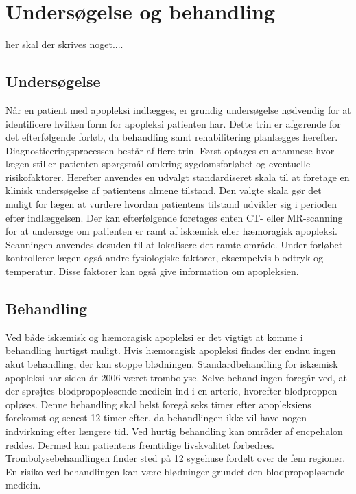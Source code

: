 \section{Undersøgelse og behandling}
her skal der skrives noget....
\subsection{Undersøgelse}
Når en patient med apopleksi indlægges, er grundig undersøgelse nødvendig for at identificere hvilken form for apopleksi patienten har. Dette trin er afgørende for det efterfølgende forløb, da behandling samt rehabilitering planlægges herefter.
Diagnosticeringsprocessen består af flere trin. Først optages en anamnese hvor lægen stiller patienten spørgsmål omkring sygdomsforløbet og eventuelle risikofaktorer. Herefter anvendes en udvalgt standardiseret skala til at foretage en klinisk undersøgelse af patientens almene tilstand. Den valgte skala gør det muligt for lægen at vurdere hvordan patientens tilstand udvikler sig i perioden efter indlæggelsen.
Der kan efterfølgende foretages enten CT- eller MR-scanning for at undersøge om patienten er ramt af iskæmisk eller hæmoragisk apopleksi. Scanningen anvendes desuden til at lokalisere det ramte område. Under forløbet kontrollerer lægen også andre fysiologiske faktorer, eksempelvis blodtryk og temperatur. Disse faktorer kan også give information om apopleksien.\cite{Sundhedsstyrelsen2009} 

\subsection{Behandling}
Ved både iskæmisk og hæmoragisk apopleksi er det vigtigt at komme i behandling hurtigst muligt. 
Hvis hæmoragisk apopleksi findes der endnu ingen akut behandling, der kan stoppe blødningen. \cite{Soenderborg2013} 
Standardbehandling for iskæmisk apopleksi har siden år 2006 været trombolyse. Selve behandlingen foregår ved, at der sprøjtes blodpropopløsende medicin ind i en arterie, hvorefter blodproppen opløses. Denne behandling skal helst foregå seks timer efter apopleksiens forekomst og senest 12 timer efter, da behandlingen ikke vil have nogen indvirkning efter længere tid. Ved hurtig behandling kan områder af encpehalon reddes. Dermed kan patientens fremtidige livskvalitet forbedres. Trombolysebehandlingen finder sted på 12 sygehuse fordelt over de fem regioner. En risiko ved behandlingen kan være blødninger grundet den blodpropopløsende medicin. \cite{Hjernesagen2015b}

